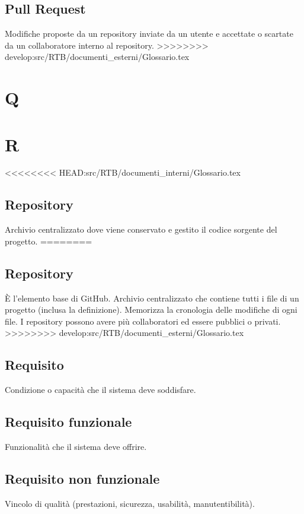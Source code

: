 \documentclass[a4paper,12pt]{article}
\begin{document}
\subsection{Pull Request}
Modifiche proposte da un repository inviate da un utente e accettate o scartate da un collaboratore interno al repository.
>>>>>>>> develop:src/RTB/documenti_esterni/Glossario.tex

\section{Q}

\section{R}

<<<<<<<< HEAD:src/RTB/documenti_interni/Glossario.tex
\subsection*{Repository}
Archivio centralizzato dove viene conservato e gestito il codice sorgente del progetto.
========
\subsection{Repository}
È l'elemento base di GitHub. Archivio centralizzato che contiene tutti i file di un progetto (inclusa la definizione). Memorizza la cronologia delle modifiche di ogni file. I repository possono avere più collaboratori ed essere pubblici o privati.
>>>>>>>> develop:src/RTB/documenti_esterni/Glossario.tex

\subsection*{Requisito}
Condizione o capacità che il sistema deve soddisfare.

\subsection*{Requisito funzionale}
Funzionalità che il sistema deve offrire.

\subsection*{Requisito non funzionale}
Vincolo di qualità (prestazioni, sicurezza, usabilità, manutentibilità).
\end{document}
